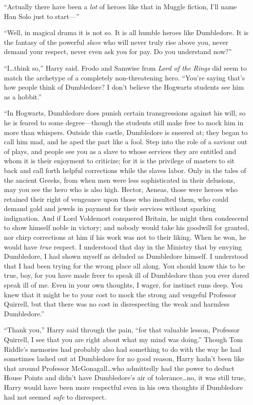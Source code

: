 “Actually there have been a \emph{lot} of heroes like that in Muggle fiction,
I’ll name Han Solo just to start—”

“Well, in magical drama it is not so. It is all humble heroes like Dumbledore.
It is the fantasy of the powerful \emph{slave} who will never truly rise above
you, never demand your respect, never even ask you for pay. Do you understand
now?”

“I…think so,” Harry said. Frodo and Samwise from \emph{Lord of the
Rings} did seem to match the archetype of a completely non-threatening hero.
“You’re saying that’s how people think of Dumbledore? I don’t believe the
Hogwarts students see him as a hobbit.”

“In Hogwarts, Dumbledore does punish certain transgressions against his will,
so he is feared to some degree—though the students still make free to mock
him in more than whispers. Outside this castle, Dumbledore is sneered at; they
began to call him mad, and he aped the part like a fool. Step into the role of
a saviour out of plays, and people see you as a slave to whose services they are
entitled and whom it is their enjoyment to criticize; for it is the privilege
of masters to sit back and call forth helpful corrections while the slaves
labor. Only in the tales of the ancient Greeks, from when men were less
sophisticated in their delusions, may you see the hero who is also high.
Hector, Aeneas, those were heroes who retained their right of vengeance upon
those who insulted them, who could demand gold and jewels in payment for their
services without sparking indignation. And if Lord Voldemort conquered Britain,
he might then condescend to show himself noble in victory; and nobody would
take his goodwill for granted, nor chirp corrections at him if his work was not
to their liking. When he won, he would have \emph{true} respect. I understood
that day in the Ministry that by envying Dumbledore, I had shown myself as
deluded as Dumbledore himself. I understood that I had been trying for the
wrong place all along. You should know this to be true, boy, for you have made
freer to speak ill of Dumbledore than you ever dared speak ill of me. Even in
your own thoughts, I wager, for instinct runs deep. You knew that it might be
to your cost to mock the strong and vengeful Professor Quirrell, but that there
was no cost in disrespecting the weak and harmless Dumbledore.”

“Thank you,” Harry said through the pain, “for that valuable lesson, Professor
Quirrell, I see that you are right about what my mind was doing.” Though Tom
Riddle’s memories had probably also had something to do with the way he had
sometimes lashed out at Dumbledore for no good reason, Harry hadn’t been like
that around Professor McGonagall…who admittedly had the power to deduct
House Points and didn’t have Dumbledore’s air of tolerance…no, it was
still true, Harry would have been more respectful even in his own thoughts if
Dumbledore had not seemed \emph{safe} to disrespect.

